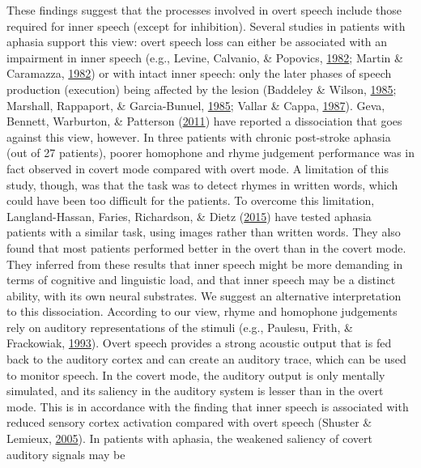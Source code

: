 \documentclass[a4paper,12pt,twoside,openright,oldfontcommands]{memoir}
\begin{document}
These findings suggest that the processes involved in overt speech
include those required for inner speech (except for inhibition). Several
studies in patients with aphasia support this view: overt speech loss
can either be associated with an impairment in inner speech (e.g.,
Levine, Calvanio, \& Popovics,
\protect\hyperlink{ref-levine_language_1982}{1982}; Martin \& Caramazza,
\protect\hyperlink{ref-martin_short-term_1982}{1982}) or with intact
inner speech: only the later phases of speech production (execution)
being affected by the lesion (Baddeley \& Wilson,
\protect\hyperlink{ref-baddeley_phonological_1985}{1985}; Marshall,
Rappaport, \& Garcia-Bunuel,
\protect\hyperlink{ref-marshall_self-monitoring_1985}{1985}; Vallar \&
Cappa, \protect\hyperlink{ref-vallar_articulation_1987}{1987}). Geva,
Bennett, Warburton, \& Patterson
(\protect\hyperlink{ref-geva_discrepancy_2011}{2011}) have reported a
dissociation that goes against this view, however. In three patients
with chronic post-stroke aphasia (out of 27 patients), poorer homophone
and rhyme judgement performance was in fact observed in covert mode
compared with overt mode. A limitation of this study, though, was that
the task was to detect rhymes in written words, which could have been
too difficult for the patients. To overcome this limitation,
Langland-Hassan, Faries, Richardson, \& Dietz
(\protect\hyperlink{ref-langland-hassan_inner_2015}{2015}) have tested
aphasia patients with a similar task, using images rather than written
words. They also found that most patients performed better in the overt
than in the covert mode. They inferred from these results that inner
speech might be more demanding in terms of cognitive and linguistic
load, and that inner speech may be a distinct ability, with its own
neural substrates. We suggest an alternative interpretation to this
dissociation. According to our view, rhyme and homophone judgements rely
on auditory representations of the stimuli (e.g., Paulesu, Frith, \&
Frackowiak, \protect\hyperlink{ref-paulesu_neural_1993}{1993}). Overt
speech provides a strong acoustic output that is fed back to the
auditory cortex and can create an auditory trace, which can be used to
monitor speech. In the covert mode, the auditory output is only mentally
simulated, and its saliency in the auditory system is lesser than in the
overt mode. This is in accordance with the finding that inner speech is
associated with reduced sensory cortex activation compared with overt
speech (Shuster \& Lemieux,
\protect\hyperlink{ref-shuster_fmri_2005}{2005}). In patients with
aphasia, the weakened saliency of covert auditory signals may be
\end{document}
